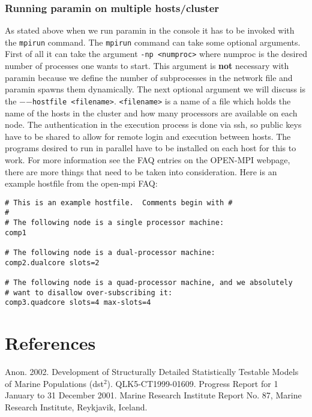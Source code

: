 \documentclass[10pt,twoside]{book}
\begin{document}
\subsection{Running paramin on multiple hosts/cluster}
As stated above when we run paramin in the console it has to be invoked with the \texttt{mpirun} command.  The \texttt{mpirun} command can take some optional arguments. First of all it can take the argument \texttt{-np <numproc>} where numproc is the desired number of processes one wants to start.  This argument is \textbf{not} necessary with paramin because we define the number of subprocesses in the network file and paramin spawns them dynamically.  The next optional argument we will discuss is the $-$$-$\texttt{hostfile <filename>}. \texttt{<filename>} is a name of a file which holds the name of the hosts in the cluster and how many processors are available on each node.  The authentication in the execution process is done via ssh, so public keys have to be shared to allow for remote login and execution between hosts.  The programs desired to run in parallel have to be installed on each host for this to work.  For more information see the FAQ entries on the OPEN-MPI webpage, there are more things that need to be taken into consideration.  Here is an example hostfile from the open-mpi FAQ:

{\small\begin{verbatim}
# This is an example hostfile.  Comments begin with #
#
# The following node is a single processor machine:
comp1

# The following node is a dual-processor machine:
comp2.dualcore slots=2

# The following node is a quad-processor machine, and we absolutely
# want to disallow over-subscribing it:
comp3.quadcore slots=4 max-slots=4
\end{verbatim}}


\chapter{References}\label{chap:reference}
Anon. 2002. Development of Structurally Detailed Statistically Testable Models of Marine Populations (dst$^{2}$). QLK5-CT1999-01609. Progress Report for 1 January to 31 December 2001. Marine Research Institute Report No. 87, Marine Research Institute, Reykjavik, Iceland.\newline
\end{document}
